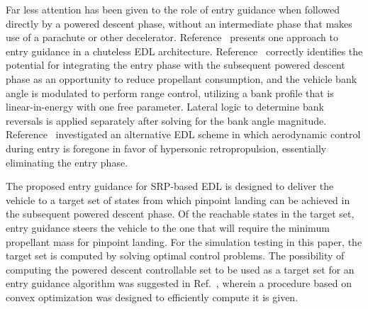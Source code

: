 Far less attention has been given to the role of entry guidance when followed directly by a powered descent phase, without an intermediate phase that makes use of a parachute or other decelerator. Reference~\cite{LuAdaptiveEDL} presents one approach to entry guidance in a chuteless EDL architecture. Reference~\cite{LuAdaptiveEDL} correctly identifies the potential for integrating the entry phase with the subsequent powered descent phase as an opportunity to reduce propellant consumption, and the vehicle bank angle is modulated to perform range control, utilizing a bank profile that is linear-in-energy with one free parameter. Lateral logic to determine bank reversals is applied separately after solving for the bank angle magnitude. Reference~\cite{EDL_AllProp} investigated an alternative EDL scheme in which aerodynamic control during entry is foregone in favor of hypersonic retropropulsion, essentially eliminating the entry phase. 

The proposed entry guidance for SRP-based EDL is designed to deliver the vehicle to a target set of states from which pinpoint landing can be achieved in the subsequent powered descent phase. Of the reachable states in the target set, entry guidance steers the vehicle to the one that will require the minimum propellant mass for pinpoint landing. For the simulation testing in this paper, the target set is computed by solving optimal control problems. 
The possibility of computing the powered descent controllable set to be used as a target set for an entry guidance algorithm was suggested in Ref.~\cite{SRP_ControllableSets}, wherein a procedure based on convex optimization was designed to efficiently compute it is given.


